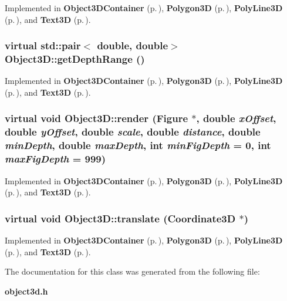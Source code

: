 Implemented in {\bf Object3DContainer} {\rm (p.\,\pageref{classObject3DContainer_a2})}, {\bf Polygon3D} {\rm (p.\,\pageref{classPolygon3D_a6})}, {\bf Poly\-Line3D} {\rm (p.\,\pageref{classPolyLine3D_a5})}, and {\bf Text3D} {\rm (p.\,\pageref{classText3D_a7})}.
\subsubsection{\setlength{\rightskip}{0pt plus 5cm}virtual std::pair$<$ double, double$>$ Object3D::get\-Depth\-Range ()\hspace{0.3cm}{\tt  [pure virtual]}}\label{classObject3D_a0}




Implemented in {\bf Object3DContainer} {\rm (p.\,\pageref{classObject3DContainer_a0})}, {\bf Polygon3D} {\rm (p.\,\pageref{classPolygon3D_a4})}, {\bf Poly\-Line3D} {\rm (p.\,\pageref{classPolyLine3D_a4})}, and {\bf Text3D} {\rm (p.\,\pageref{classText3D_a5})}.
\subsubsection{\setlength{\rightskip}{0pt plus 5cm}virtual void Object3D::render ({\bf Figure} $\ast$, double {\em x\-Offset}, double {\em y\-Offset}, double {\em scale}, double {\em distance}, double {\em min\-Depth}, double {\em max\-Depth}, int {\em min\-Fig\-Depth} = 0, int {\em max\-Fig\-Depth} = 999)\hspace{0.3cm}{\tt  [pure virtual]}}\label{classObject3D_a1}




Implemented in {\bf Object3DContainer} {\rm (p.\,\pageref{classObject3DContainer_a1})}, {\bf Polygon3D} {\rm (p.\,\pageref{classPolygon3D_a5})}, {\bf Poly\-Line3D} {\rm (p.\,\pageref{classPolyLine3D_a6})}, and {\bf Text3D} {\rm (p.\,\pageref{classText3D_a6})}.
\subsubsection{\setlength{\rightskip}{0pt plus 5cm}virtual void Object3D::translate ({\bf Coordinate3D} $\ast$)\hspace{0.3cm}{\tt  [pure virtual]}}\label{classObject3D_a3}




Implemented in {\bf Object3DContainer} {\rm (p.\,\pageref{classObject3DContainer_a3})}, {\bf Polygon3D} {\rm (p.\,\pageref{classPolygon3D_a7})}, {\bf Poly\-Line3D} {\rm (p.\,\pageref{classPolyLine3D_a7})}, and {\bf Text3D} {\rm (p.\,\pageref{classText3D_a8})}.

The documentation for this class was generated from the following file:\begin{CompactItemize}
\item 
{\bf object3d.h}\end{CompactItemize}
